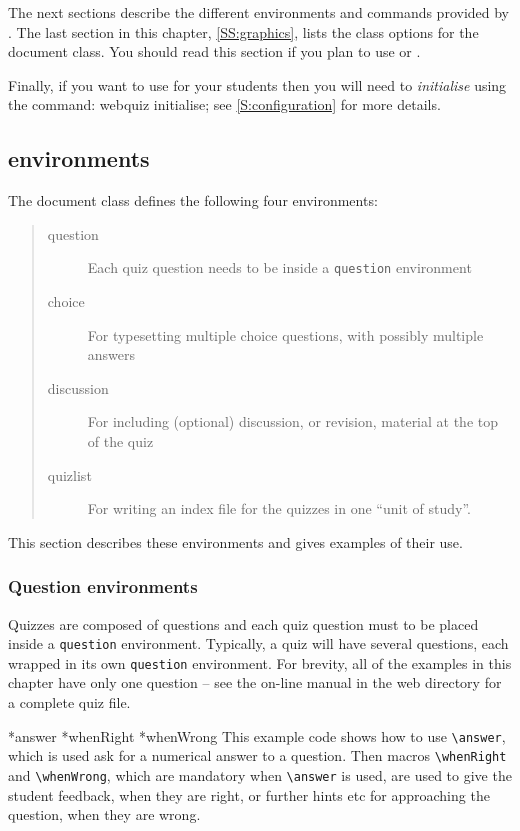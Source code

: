 \documentclass[svgnames]{article}
\makeatletter
\newcommand\macroIndex[1]{%
  \lowercase{\def\temp{#1}}%
  \expandafter\index\expandafter{\temp@\textbackslash#1}%
}
\newcommand\gobbleone[1]{}%
\newcommand\SeeIndex[2]{\index{#1!zzzz@\protect\gobbleone|See{#2}}}
\newcommand\ddash{\texttt{\textemdash\textemdash}}
\newcommand\webquizopt[1]{\textsf{webquiz \ddash#1}}
\makeatother
\begin{document}
  The next sections describe the different environments and commands
  provided by \WebQuiz. The last section in this chapter,
  \autoref{SS:graphics}, lists the class options for the \WebQuiz
  document class. You should read this section if you plan to use
   or .

  Finally, if you want to use \WebQuiz for your students then you will
  need to \textit{initialise} \WebQuiz using the command:
  \webquizopt{initialise}; see \autoref{S:configuration} for more
  details.

\subsection{\WebQuiz environments}

The \WebQuiz document class defines the following four environments:
\begin{quote}
  \begin{description}
    \item[question] Each quiz question needs to be inside a
    \Verb|question| environment
    \item[choice] For typesetting multiple choice questions, with
    possibly multiple answers
    \item[discussion] For including (optional) discussion, or revision,
    material at the top of the quiz
    \item[quizlist] For writing an index file for the quizzes in
    one ``unit of study''.
  \end{description}
\end{quote}
This section describes these environments and gives examples
of their use.

\subsubsection{Question environments}

Quizzes are composed of questions and each quiz question must to be
placed inside a \Verb|question| environment. Typically, a quiz will have
several questions, each wrapped in its own \Verb|question| environment.
For brevity, all of the examples in this chapter have only one question
-- see the on-line manual in the \WebQuiz web directory for a complete quiz file.

  
  \macroIndex{answer}*{answer}
  *{whenRight}
  *{whenWrong}
  \SeeIndex{numeric answer}{\textbackslash answer}
  This example code shows how to use \Verb|\answer|, which is used
  ask for a numerical answer to a question. Then macros
  \Verb|\whenRight| and \Verb|\whenWrong|, which are mandatory when
  \Verb|\answer| is used, are used to give the student feedback, when
  they are right, or further hints etc for approaching the question,
  when they are wrong.
\end{document}
